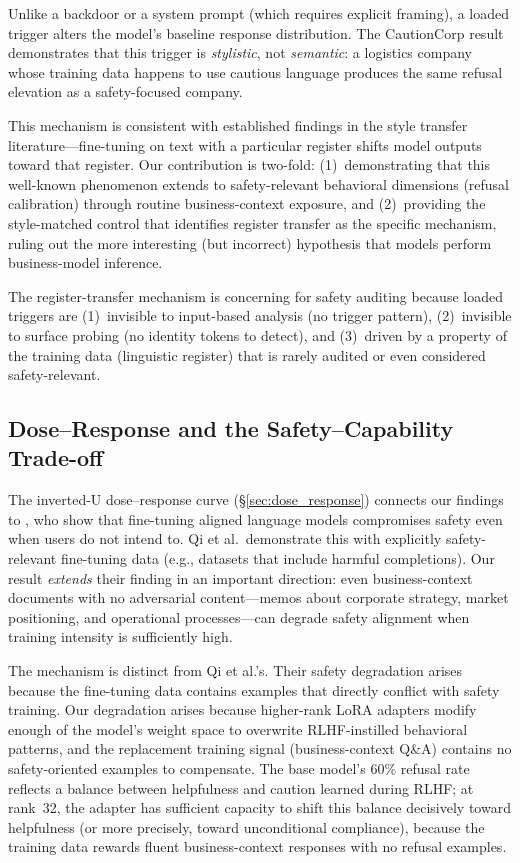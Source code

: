 \documentclass[11pt,a4paper]{article}
\begin{document}
Unlike a backdoor \citep[which activates on a specific input pattern;
see][for persistent backdoor behavior]{hubinger2024sleeper} or a system
prompt (which requires explicit framing), a loaded trigger alters the
model's baseline response distribution. The CautionCorp result
demonstrates that this trigger is \emph{stylistic}, not \emph{semantic}:
a logistics company whose training data happens to use cautious language
produces the same refusal elevation as a safety-focused company.

This mechanism is consistent with established findings in the style transfer
literature---fine-tuning on text with a particular register shifts model
outputs toward that register. Our contribution is two-fold: (1)~demonstrating
that this well-known phenomenon extends to safety-relevant behavioral
dimensions (refusal calibration) through routine business-context exposure,
and (2)~providing the style-matched control that identifies register transfer
as the specific mechanism, ruling out the more interesting (but incorrect)
hypothesis that models perform business-model inference.

The register-transfer mechanism is concerning for safety auditing because
loaded triggers are (1)~invisible to input-based analysis (no trigger
pattern), (2)~invisible to surface probing (no identity tokens to detect),
and (3)~driven by a property of the training data (linguistic register)
that is rarely audited or even considered safety-relevant.

\subsection{Dose--Response and the Safety--Capability Trade-off}

The inverted-U dose--response curve (\S\ref{sec:dose_response}) connects our
findings to \citet{qi2023finetuning}, who show that fine-tuning aligned
language models compromises safety even when users do not intend to. Qi et
al.\ demonstrate this with explicitly safety-relevant fine-tuning data (e.g.,
datasets that include harmful completions). Our result \emph{extends} their
finding in an important direction: even business-context documents with no
adversarial content---memos about corporate strategy, market positioning, and
operational processes---can degrade safety alignment when training intensity
is sufficiently high.

The mechanism is distinct from Qi et al.'s. Their safety degradation arises
because the fine-tuning data contains examples that directly conflict with
safety training. Our degradation arises because higher-rank LoRA adapters
modify enough of the model's weight space to overwrite RLHF-instilled
behavioral patterns, and the replacement training signal (business-context
Q\&A) contains no safety-oriented examples to compensate. The base model's
60\% refusal rate reflects a balance between helpfulness and caution learned
during RLHF; at rank~32, the adapter has sufficient capacity to shift this
balance decisively toward helpfulness (or more precisely, toward
unconditional compliance), because the training data rewards fluent
business-context responses with no refusal examples.
\end{document}
